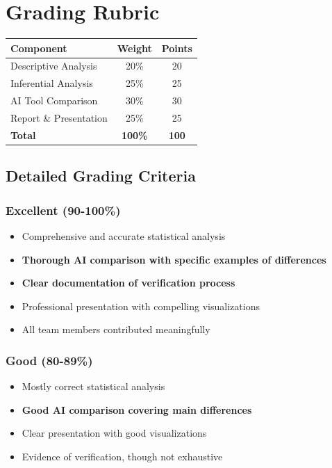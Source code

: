 \documentclass[11pt]{article}
\begin{document}
\section{Grading Rubric}

\begin{center}
\begin{tabular}{lcc}
\toprule
\textbf{Component} & \textbf{Weight} & \textbf{Points} \\
\midrule
Descriptive Analysis & 20\% & 20 \\
Inferential Analysis & 25\% & 25 \\
AI Tool Comparison & 30\% & 30 \\
Report \& Presentation & 25\% & 25 \\
\midrule
\textbf{Total} & \textbf{100\%} & \textbf{100} \\
\bottomrule
\end{tabular}
\end{center}

\subsection{Detailed Grading Criteria}

\subsubsection{Excellent (90-100\%)}
\begin{itemize}
\item Comprehensive and accurate statistical analysis
\item \textbf{Thorough AI comparison with specific examples of differences}
\item \textbf{Clear documentation of verification process}
\item Professional presentation with compelling visualizations
\item All team members contributed meaningfully
\end{itemize}

\subsubsection{Good (80-89\%)}
\begin{itemize}
\item Mostly correct statistical analysis
\item \textbf{Good AI comparison covering main differences}
\item Clear presentation with good visualizations
\item Evidence of verification, though not exhaustive
\end{itemize}
\end{document}
